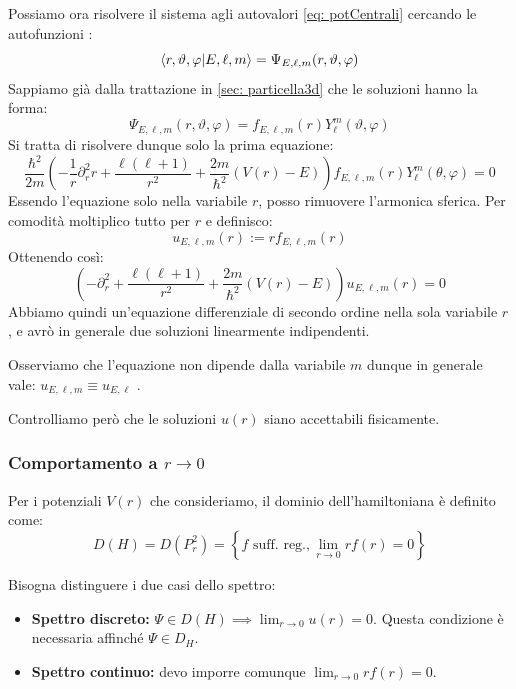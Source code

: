 Possiamo ora risolvere il sistema agli autovalori \ref{eq: potCentrali} cercando le autofunzioni : \[\braket{r,\vartheta, \varphi}{E, \ell, m}= \Psi_{E, \ell, m}(r, \vartheta, \varphi)\]
Sappiamo già dalla trattazione in \ref{sec: particella3d} che le soluzioni hanno la forma:
\begin{equation}
    \Psi_{E, \ell, m}(r, \vartheta, \varphi)= f_{E,\ell,m}(r)Y^m_\ell(\vartheta,\varphi)
\end{equation}
Si tratta di risolvere dunque solo la prima equazione:
\begin{equation}
    \frac{\hbar^2}{2m} \left( -\frac{1}{r} \partial_r^2 r + \frac{\ell(\ell+1)}{r^2} + \frac{2m}{\hbar^2}(V(r)-E) \right) f_{E,\ell,m}(r) Y_\ell^m(\theta, \varphi) = 0
\end{equation}
Essendo l'equazione solo nella variabile \(r\), posso rimuovere l'armonica sferica. Per comodità moltiplico tutto per \(r\) e definisco:
\begin{equation}
    u_{E,\ell,m}(r) := r f_{E,\ell,m}(r)
\end{equation}
Ottenendo così:
\begin{equation}
    \left( -\partial_r^2 + \frac{\ell(\ell+1)}{r^2} + \frac{2m}{\hbar^2}(V(r)-E) \right) u_{E,\ell,m}(r) = 0
\end{equation}
Abbiamo quindi un'equazione differenziale di secondo ordine nella sola variabile \(r\), e avrò in generale due soluzioni linearmente indipendenti. 
\begin{remark}
    Osserviamo che l'equazione non dipende dalla variabile \(m\) dunque in generale vale: \(u_{E,\ell,m}\equiv u_{E,\ell}\) .
\end{remark}
Controlliamo però che le soluzioni \(u(r)\) siano accettabili fisicamente.

\subsubsection{Comportamento a \(r\to 0\)}

Per i potenziali \( V(r) \) che consideriamo, il dominio dell'hamiltoniana è definito come:
\[
D(H) = D(P_r^2) = \left\{ f \text{ suff. reg.}, \lim_{r\to 0} r f(r) = 0 \right\}
\]

Bisogna distinguere i due casi dello spettro:
\begin{itemize}
    \item \textbf{Spettro discreto:} \( \Psi \in D(H) \implies \lim_{r\to 0} u(r) = 0 \). Questa condizione è necessaria affinché \( \Psi \in D_H \).
    \item \textbf{Spettro continuo:} devo imporre comunque \( \lim_{r\to 0} r f(r) = 0 \).
\end{itemize}

